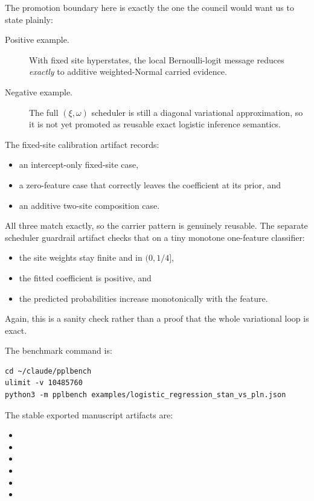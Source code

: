 \documentclass[11pt,openany]{report}
\begin{document}
The promotion boundary here is exactly the one the council would want us to
state plainly:
\begin{description}
\item[Positive example.] With fixed site hyperstates, the local Bernoulli-logit
message reduces \emph{exactly} to additive weighted-Normal carried evidence.
\item[Negative example.] The full \((\xi, \omega)\) scheduler is still a
diagonal variational approximation, so it is not yet promoted as reusable exact
logistic inference semantics.
\end{description}

The fixed-site calibration artifact
records:
\begin{itemize}
\item an intercept-only fixed-site case,
\item a zero-feature case that correctly leaves the coefficient at its prior,
and
\item an additive two-site composition case.
\end{itemize}
All three match exactly, so the carrier pattern is genuinely reusable.  The
separate scheduler guardrail artifact
checks that on a tiny monotone one-feature classifier:
\begin{itemize}
\item the site weights stay finite and in \((0, 1/4]\),
\item the fitted coefficient is positive, and
\item the predicted probabilities increase monotonically with the feature.
\end{itemize}
Again, this is a sanity check rather than a proof that the whole variational
loop is exact.

The benchmark command is:
\begin{lstlisting}
cd ~/claude/pplbench
ulimit -v 10485760
python3 -m pplbench examples/logistic_regression_stan_vs_pln.json
\end{lstlisting}

The stable exported manuscript artifacts are:
\begin{itemize}
\item {}
\item {}
\item {}
\item {}
\item {}
\item {}
\end{itemize}
\end{document}
